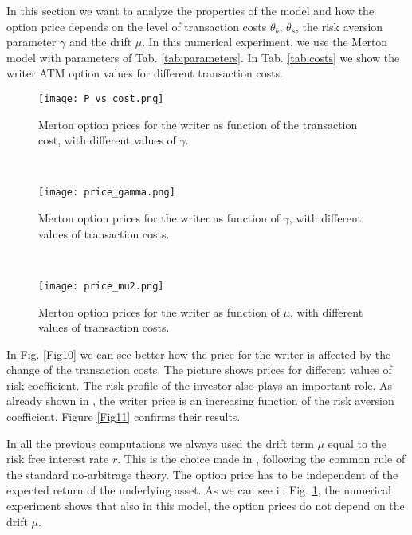 In this section we want to analyze the properties of the model and how the option price depends on the level of transaction costs $\theta_b$, $\theta_s$, 
the risk aversion parameter $\gamma$ and the drift $\mu$. 
In this numerical experiment, we use the Merton model with parameters of Tab. \ref{tab:parameters}.
In Tab. \ref{tab:costs} we show the writer ATM option values for different transaction costs.  
\begin{figure}[t!]
 \begin{minipage}[b]{0.5\linewidth}
   \centering
   \texttt{[image: P\_vs\_cost.png]}
   \caption{Merton option prices for the writer as function of the transaction cost, with different values of $\gamma$.}
   \label{Fig10} 
 \end{minipage}
 \ \hspace{2mm} \hspace{3mm} \
 \begin{minipage}[b]{0.5\linewidth}
  \centering
   \texttt{[image: price\_gamma.png]}
   \caption{Merton option prices for the writer as function of $\gamma$, with different values of transaction costs.}
   \label{Fig11}
 \end{minipage}
  \ \hspace{2mm} \hspace{3mm} \
  \begin{minipage}[b]{\linewidth}
  \centering
   \texttt{[image: price\_mu2.png]}
   \caption{Merton option prices for the writer as function of $\mu$, with different values of transaction costs.}
   \label{Fig12}
 \end{minipage}
\end{figure}


In Fig. \ref{Fig10} we can see better how the price for the writer is affected by the change of the transaction costs. 
The picture shows prices for different values of risk coefficient.
The risk profile of the investor also plays an important role. As already shown in \cite{HoNe89}, the writer price is an
increasing function of the risk aversion coefficient. Figure \ref{Fig11} confirms their results.

In all the previous computations we always used the drift term $\mu$ equal to the risk free interest rate $r$. This is the choice   
made in \cite{HoNe89}, following the common rule of the standard no-arbitrage
theory.
The option price has to be independent of the expected return of the underlying asset.
As we can see in Fig. \ref{Fig12}, the numerical experiment shows that also in this model, the option prices 
do not depend on the drift $\mu$.



